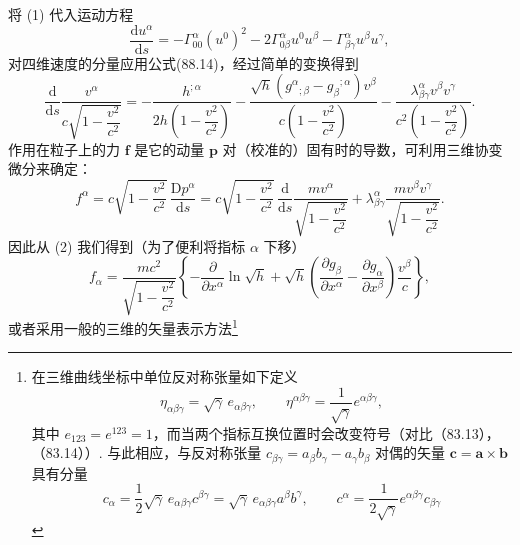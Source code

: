 \begin{xiti}
将 (1) 代入运动方程
\begin{equation*}
  \frac{\mathrm{d}u^{\alpha}}{\mathrm{d}s}
  =-\Gamma^{\alpha}_{00}(u^0)^2
  -2\Gamma^{\alpha}_{0\beta}u^0u^{\beta}
  -\Gamma^{\alpha}_{\beta\gamma}u^{\beta}u^{\gamma},
\end{equation*}
对四维速度的分量应用公式(88.14)，经过简单的变换得到
\begin{equation*}
  \frac{\mathrm{d}}{\mathrm{d}s}
  \frac{v^{\alpha}}{c\sqrt{1-\dfrac{v^2}{c^2}}}
  =-\frac{h^{;\alpha}}{2h\left(1-\dfrac{v^2}{c^2}\right)}
  -\frac{\sqrt{h}\left(g^{\alpha}{}_{;\beta}
  -g_{\beta}{}^{;\alpha}\right)v^{\beta}}
  {c\left(1-\dfrac{v^2}{c^2}\right)}
  -\frac{\lambda^{\alpha}_{\beta\gamma}v^{\beta}v^{\gamma}}
  {c^2\left(1-\dfrac{v^2}{c^2}\right)}.
\tag{2}\end{equation*}
作用在粒子上的力 $\boldsymbol{f}$ 是它的动量 $\boldsymbol{p}$ 对（校准的）固有时的导数，可利用三维协变微分来确定：
\begin{equation*}
  f^{\alpha}=c\sqrt{1-\frac{v^2}{c^2}}\,
  \frac{\mathrm{D}p^{\alpha}}{\mathrm{d}s}
  =c\sqrt{1-\frac{v^2}{c^2}}\,\frac{\mathrm{d}}{\mathrm{d}s}
  \frac{mv^{\alpha}}{\sqrt{1-\dfrac{v^2}{c^2}}}
  +\lambda^{\alpha}_{\beta\gamma}
  \frac{mv^{\beta}v^{\gamma}}{\sqrt{1-\dfrac{v^2}{c^2}}}.
\end{equation*}
因此从 (2) 我们得到（为了便利将指标 $\alpha$ 下移）
\begin{equation*}
  f_{\alpha}=\frac{mc^2}{\sqrt{1-\dfrac{v^2}{c^2}}}
  \left\{-\frac{\partial}{\partial x^{\alpha}}\ln\sqrt{h}
  +\sqrt{h}\left(\frac{\partial g_{\beta}}{\partial x^{\alpha}}
  -\frac{\partial g_{\alpha}}{\partial x^{\beta}}\right)
  \frac{v^{\beta}}{c}\right\},
\end{equation*}
或者采用一般的三维的矢量表示方法\footnote{在三维曲线坐标中单位反对称张量如下定义
\begin{equation*}
  \eta_{\alpha\beta\gamma}=\sqrt{\gamma}\,e_{\alpha\beta\gamma},\qquad
  \eta^{\alpha\beta\gamma}=\frac{1}{\sqrt{\gamma}}e^{\alpha\beta\gamma},
\end{equation*}
其中 $e_{123}=e^{123}=1$，而当两个指标互换位置时会改变符号（对比（83.13），（83.14））. 与此相应，与反对称张量 $c_{\beta\gamma}=a_{\beta}b_{\gamma}-a_{\gamma}b_{\beta}$ 对偶的矢量 $\boldsymbol{c}=\boldsymbol{a}\times\boldsymbol{b}$ 具有分量
\begin{equation*}
  c_{\alpha}=\frac{1}{2}\sqrt{\gamma}\,e_{\alpha\beta\gamma}c^{\beta\gamma}
  =\sqrt{\gamma}\,e_{\alpha\beta\gamma}a^{\beta}b^{\gamma},\qquad
  c^{\alpha}=\frac{1}{2\sqrt{\gamma}}e^{\alpha\beta\gamma}c_{\beta\gamma}

\end{equation*}}
\end{xiti}
